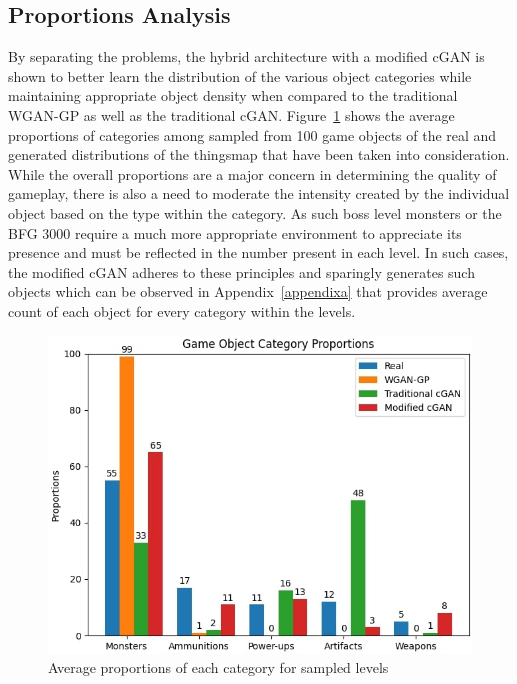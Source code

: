 \documentclass{Configuration_Files/PoliMi3i_thesis}
\begin{document}
\subsection{Proportions Analysis}
By separating the problems, the hybrid architecture with a modified cGAN is shown
to better learn the distribution of the various object categories while maintaining 
appropriate object density when compared to the traditional WGAN-GP as well as the 
traditional cGAN. Figure~\ref{fig:categoyproportions} shows the average proportions of categories among
sampled from 100 game objects of the real and generated distributions of the 
thingsmap that have been taken into consideration. While the overall proportions are 
a major concern in determining the quality of gameplay, there is also a need to 
moderate the intensity created by the individual object based on the type within the 
category. As such boss level monsters or the BFG 3000 require a much more 
appropriate environment to appreciate its presence and must be reflected in the 
number present in each level. In such cases, the modified cGAN adheres to these 
principles and sparingly generates such objects which can be observed in Appendix~\ref{appendixa} 
that provides average count of each object for every category within the levels.
\begin{figure}[H]
    \centering
    \includegraphics[width=1\textwidth]{cate_props.jpg}
    \caption{Average proportions of each category for sampled levels}
    \label{fig:categoyproportions}
\end{figure}
\newpage
\end{document}
